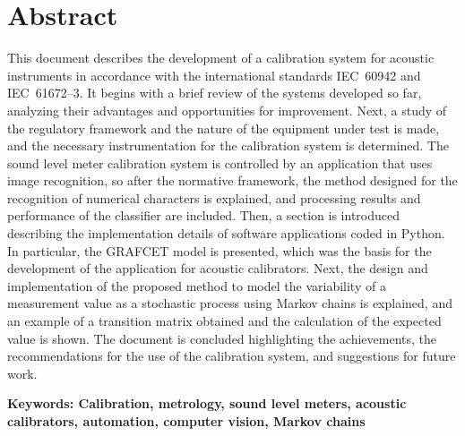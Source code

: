 \chapter*{Abstract}
This document describes the development of a calibration system for acoustic instruments in accordance with the
international standards \mbox{IEC 60942} and \mbox{IEC 61672--3}.
It begins with a brief review of the systems developed so far, analyzing their advantages and opportunities for
improvement.
Next, a study of the regulatory framework and the nature of the equipment under test is made, and the necessary
instrumentation for the calibration system is determined.
The sound level meter calibration system is controlled by an application that uses image recognition, so after the
normative framework, the method designed for the recognition of numerical characters is explained, and processing
results
and performance of the classifier are included.
Then, a section is introduced describing the implementation details of software applications coded in Python.
In particular, the GRAFCET model is presented, which was the basis for the development of the application for acoustic
calibrators.
Next, the design and implementation of the proposed method to model the variability of a measurement value as a
stochastic
process using Markov chains is explained, and an example of a transition matrix obtained and the calculation of the
expected value is shown.
The document is concluded highlighting the achievements, the recommendations for the use of the calibration system, and
suggestions for future work.

\textbf{\small Keywords: Calibration, metrology, sound level meters, acoustic calibrators, automation,
    computer vision, Markov chains}
\vfill